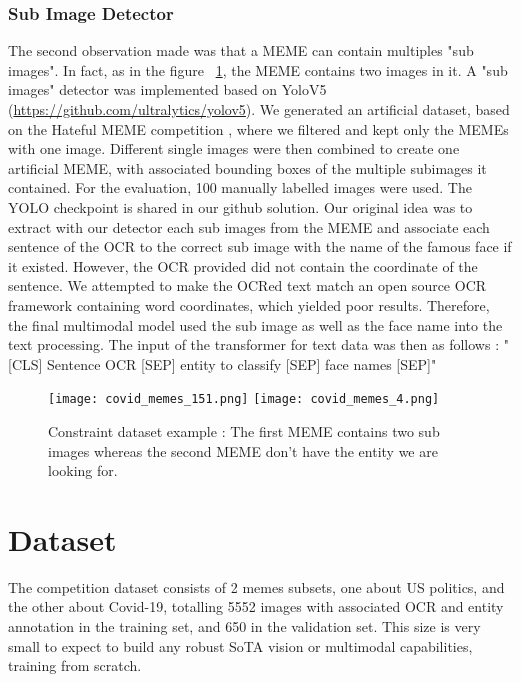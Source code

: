\documentclass[11pt]{article}
\begin{document}
\subsubsection{Sub Image Detector}
The second observation made was that a MEME can contain multiples "sub images". In fact, as in the figure ~\ref{fig:example_meme_meta}, the MEME contains two images in it. A "sub images" detector was implemented based on YoloV5 (\href{https://github.com/ultralytics/yolov5}{https://github.com/ultralytics/yolov5}). We generated an artificial dataset, based on the Hateful MEME competition \cite{kiela2020hateful}, where we filtered and kept only the MEMEs with one image. Different single images were then combined to create one artificial MEME, with associated bounding boxes of the multiple subimages it contained. For the evaluation, 100 manually labelled images were used. The YOLO checkpoint is shared in our github solution. Our original idea was to extract with our detector each sub images from the MEME and associate each sentence of the OCR to the correct sub image with the name of the famous face if it existed. However, the OCR provided did not contain the coordinate of the sentence. We attempted to make the OCRed text match an open source OCR framework containing word coordinates, which yielded poor results. Therefore, the final multimodal model used the sub image as well as the face name into the text processing. The input of the transformer for text data was then as follows : "[CLS] Sentence OCR [SEP] entity to classify [SEP] face names [SEP]"
\begin{figure}
    \texttt{[image: covid\_memes\_151.png]}
    \texttt{[image: covid\_memes\_4.png]}
    \caption{Constraint dataset example : The first MEME contains two sub images whereas the second MEME don't have the entity we are looking for.}
    \label{fig:example_meme_meta}
\end{figure}

\section{Dataset}

The competition dataset consists of 2 memes subsets, one about US politics, and the other about Covid-19, totalling 5552 images with associated OCR and entity annotation in the training set, and 650 in the validation set. This size is very small to expect to build any robust SoTA vision or multimodal capabilities, training from scratch. 
\end{document}
